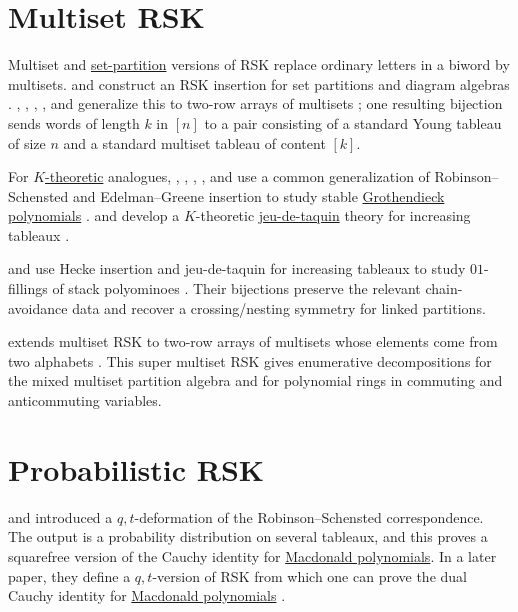 \section[multisetRSK]{Multiset RSK}

Multiset and \hyperref[setPartitions]{set-partition} versions of RSK replace
ordinary letters in a biword by multisets.   and
 construct an RSK insertion for set partitions and
diagram algebras
\cite{HalversonLewandowski2005}.  ,
, , , and
 generalize this to two-row arrays of multisets
\cite{ColmenarejoOrellanaSaliolaSchillingZabrocki2020}; one resulting
bijection sends words of length $k$ in $[n]$ to a pair consisting of a
standard Young tableau of size $n$ and a standard multiset tableau of content
$[k]$.

For \hyperref[kTheory]{$K$-theoretic} analogues, ,
,
, , and 
use a common generalization of Robinson--Schensted and Edelman--Greene
insertion to study stable \hyperref[grothendieck]{Grothendieck polynomials}
\cite{BuchKreschShimozonoTamvakisYong2007}.   and
 develop a $K$-theoretic \hyperref[jeuDeTaquin]{jeu-de-taquin} theory for
increasing tableaux \cite{ThomasYong2009}.

 and  use Hecke insertion and
jeu-de-taquin for increasing tableaux to study $01$-fillings of stack
polyominoes \cite{GuoPoznanovic2020}.  Their bijections preserve the relevant
chain-avoidance data and recover a crossing/nesting symmetry for linked
partitions.

 extends multiset RSK to two-row arrays of multisets
whose elements come from two alphabets \cite{Wilson2024}.  This super
multiset RSK gives enumerative decompositions for the mixed multiset
partition algebra and for polynomial rings in commuting and anticommuting
variables.


\section[probabilisticRSK]{Probabilistic RSK}

 and 
\cite{FriedenSchreierAigner2021} introduced a $q,t$-deformation of the
Robinson--Schensted correspondence.  The output is a probability distribution
on several tableaux, and this proves a squarefree version of the Cauchy
identity for \hyperref[macdonaldP]{Macdonald polynomials}.  In a later paper,
they define a $q,t$-version of RSK from which one can prove the dual Cauchy
identity for \hyperref[macdonaldP]{Macdonald polynomials}
\cite{FriedenSchreierAigner2024x}.


